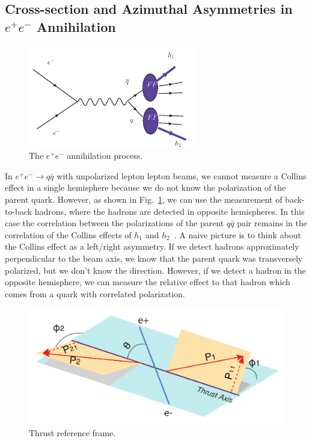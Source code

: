 \subsection{Cross-section and Azimuthal Asymmetries in $e^+e^-$ Annihilation}

 \begin{figure}[t]
    \centering
    \includegraphics[width=0.65\textwidth,natwidth=610,natheight=642]{figure_theory/e+e-.png}
    \caption{The $e^+e^-$ annihilation process.}
    \label{fig:e+e-}
\end{figure}

In $e^+e^-\rightarrow q \bar q$  with unpolarized lepton lepton beams, we cannot measure a Collins effect in a single hemisphere because we do not know the polarization of the parent quark. 
However, as shown in Fig.~\ref{fig:e+e-}, we can use the measurement of back-to-back hadrons, where the hadrons are detected in opposite hemispheres. In this case the correlation between the polarizations of the parent $q \bar q$ pair remains in the correlation of the Collins effects of $h_1$ and $h_2$~\cite{BoerThesis,ChargedPionResult2}. A naive picture is to think about the Collins effect as a left/right asymmetry. If we detect hadrons approximately perpendicular to the beam axis, we know that the parent quark was transversely polarized, but we don't know the direction. However, if we detect a hadron in the opposite hemisphere, we can measure the relative effect to that hadron which comes from a quark with correlated polarization.


\begin{figure}[t]
  \centering     
  \includegraphics[width=.75\textwidth,natwidth=600,natheight=400]{figure_theory/e+e-_phi1phi2.pdf}
  \caption{Thrust reference frame.}
  \label{fig:phi1phi2frame}
\end{figure}

